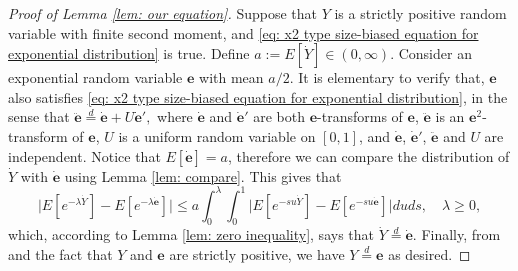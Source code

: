 \documentclass[12pt,a4paper]{amsart}
\numberwithin{equation}{section}
\begin{document}
\begin{proof}[Proof of Lemma \ref{lem: our equation}]
	Suppose that $Y$ is a strictly positive random variable with finite second moment, and \eqref{eq: x2 type size-biased equation for exponential distribution} is true.
	Define
$
	a
	:= E[\dot Y] \in (0,\infty)
$.
 	Consider an exponential random variable $\mathbf e$ with mean $a/2$.
	It is elementary to verify that, $\mathbf e$ also satisfies \eqref{eq: x2 type size-biased equation for exponential distribution}, in the sense that
$
	\ddot {\mathbf e} \overset{d} = \dot {\mathbf e}+U\dot {\mathbf e}',
$
	where $\dot {\mathbf e}$ and $\dot {\mathbf e}'$ are 
both $\mathbf e$-transforms of $\mathbf e$, 
	$\ddot {\mathbf e}$ is an $\mathbf e^2$-transform of $\mathbf e$, 
	$U$ is a uniform random variable on $[0,1]$, and $\dot {\mathbf e}$, $\dot {\mathbf e}'$, 
	$\ddot {\mathbf e}$ and $U$ are independent.
	Notice that $E[\dot {\mathbf e}] = a$, therefore we can compare the distribution of $\dot Y$ with $\dot {\mathbf e}$ using Lemma \ref{lem: compare}.
	This gives that
\[
	\big|E[ e^{-\lambda \dot Y}] - E[ e^{-\lambda \dot {\mathbf e}}] \big|
	\leq  a  \int_0^\lambda \int_0^1 \big| E [e^{-s u \dot Y}] - E [e^{-s u \dot {\mathbf e}}] \big| du ds,
	\quad \lambda \geq 0,
\]
	which, according to Lemma \ref{lem: zero inequality}, says that 
	$\dot Y \overset{d} = \dot {\mathbf e}$.
	Finally, from \cite[Lemma 2.6]{ArratiaGoldsteinKochman2013} and the fact that $Y$ and $\mathbf e$ are strictly positive, we have
	$Y \overset{d} = \mathbf e$ as desired.
\end{proof}
\end{document}
